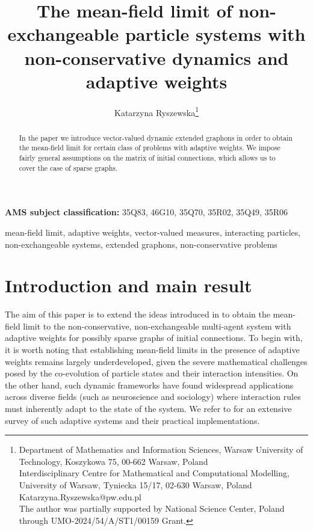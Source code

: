 \documentclass[10pt]{article}
\title{The mean-field limit of non-exchangeable particle systems with non-conservative dynamics and adaptive weights}
\author{Katarzyna Ryszewska\footnote{Department of Mathematics and Information Sciences,
Warsaw University of Technology,
Koszykowa 75, 00-662 Warsaw, Poland \\
 Interdisciplinary Centre for Mathematical and Computational Modelling, 
University of Warsaw, 
Tyniecka 15/17, 02-630 Warsaw, Poland \\
Katarzyna.Ryszewska@pw.edu.pl \\
The author was partially supported by National Science Center, Poland through 
UMO-2024/54/A/ST1/00159 Grant.
}}
\begin{document}
\date{}
\maketitle
\begin{abstract}
In the paper we introduce vector-valued dynamic extended graphons in order to obtain the mean-field limit for certain class of problems with adaptive weights. We impose fairly general assumptions on the matrix of initial connections, which allows us to cover the case of sparse graphs.  
\end{abstract}
\vspace{0.7em}
\begin{center}
{\bf AMS subject classification:} 35Q83, 46G10, 35Q70, 35R02, 35Q49, 35R06
\end{center}

 mean-field limit, adaptive weights, vector-valued measures, interacting particles, non-exchangeable systems, extended graphons, non-conservative problems
\section{Introduction and main result}

The aim of this paper is to extend the ideas introduced in \cite{JPS2025} to obtain the mean-field limit to the non-conservative, non-exchangeable multi-agent system with adaptive weights for possibly sparse graphs of initial connections. To begin with, it is worth noting that establishing mean-field limits in the presence of adaptive weights remains largely underdeveloped, given the severe mathematical challenges posed by the co-evolution of particle states and their interaction intensities. On the other hand, such dynamic frameworks have found widespread applications across diverse fields (such as neuroscience and sociology) where interaction rules must inherently adapt to the state of the system. We refer to \cite{fizyka} for an extensive survey of such adaptive systems and their practical implementations.
\end{document}
